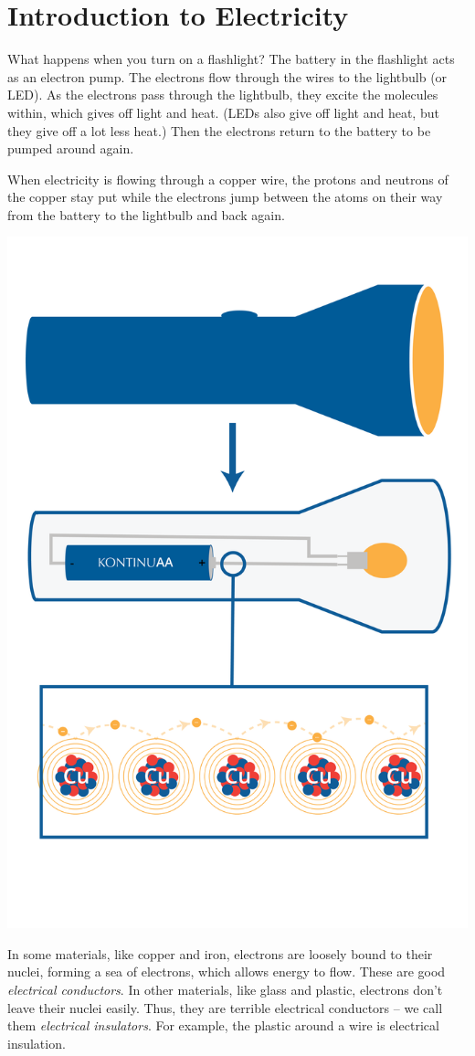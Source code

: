 \chapter{Introduction to Electricity}

What happens when you turn on a flashlight? The battery in the
flashlight acts as an electron pump. The electrons flow through the
wires to the lightbulb (or LED). As the electrons pass through the
lightbulb, they excite the molecules within, which gives off light and
heat. (LEDs also give off light and heat, but they give off a lot less
heat.) Then the electrons return to the battery to be pumped around
again.

When electricity is flowing through a copper wire, the protons and
neutrons of the copper stay put while the electrons jump between the
atoms on their way from the battery to the lightbulb and back again.

\includegraphics[width=.5\textwidth]{flashlight.png}


In some materials, like copper and iron, electrons are loosely bound
to their nuclei, forming a sea of electrons, which allows energy to flow. These are good \textit{electrical conductors}. In
other materials, like glass and plastic, electrons don't leave their
nuclei easily. Thus, they are terrible electrical conductors -- we call
them \textit{electrical insulators}. For example, the plastic around a
wire is electrical insulation.

